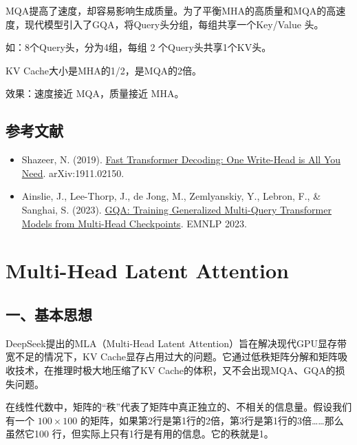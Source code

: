 MQA提高了速度，却容易影响生成质量。为了平衡MHA的高质量和MQA的高速度，现代模型引入了GQA，将Query头分组，每组共享一个Key/Value 头。

如：8个Query头，分为4组，每组 2 个Query头共享1个KV头。

KV Cache大小是MHA的1/2，是MQA的2倍。

效果：速度接近 MQA，质量接近 MHA。

\hypertarget{ux53c2ux8003ux6587ux732e-94}{%
\subsection{参考文献}\label{ux53c2ux8003ux6587ux732e-94}}

\vspace{0.25em}
\begin{itemize}
\tightlist
\item
  Shazeer, N. (2019). \href{https://arxiv.org/abs/1911.02150}{Fast Transformer Decoding: One Write-Head is All You Need}. arXiv:1911.02150.
\item
  Ainslie, J., Lee-Thorp, J., de Jong, M., Zemlyanskiy, Y., Lebron, F., \& Sanghai, S. (2023). \href{https://arxiv.org/abs/2305.13245}{GQA: Training Generalized Multi-Query Transformer Models from Multi-Head Checkpoints}. EMNLP 2023.
\end{itemize}

\clearpage

\hypertarget{multi-head-latent-attention}{%
\section{Multi-Head Latent Attention}\label{multi-head-latent-attention}}

\hypertarget{ux4e00ux57faux672cux601dux60f3-1}{%
\subsection{一、基本思想}\label{ux4e00ux57faux672cux601dux60f3-1}}

DeepSeek提出的MLA（Multi-Head Latent Attention）旨在解决现代GPU显存带宽不足的情况下，KV Cache显存占用过大的问题。它通过低秩矩阵分解和矩阵吸收技术，在推理时极大地压缩了KV Cache的体积，又不会出现MQA、GQA的损失问题。

在线性代数中，矩阵的``秩''代表了矩阵中真正独立的、不相关的信息量。假设我们有一个 \(100\times100\) 的矩阵，如果第2行是第1行的2倍，第3行是第1行的3倍\ldots\ldots 那么虽然它100 行，但实际上只有1行是有用的信息。它的秩就是1。

